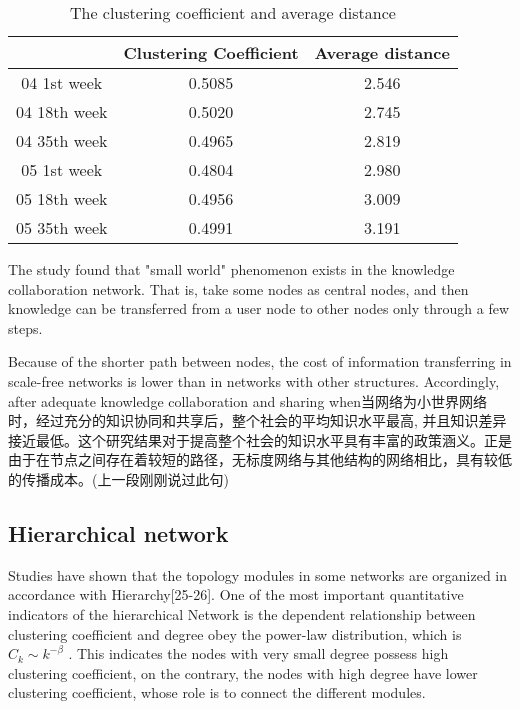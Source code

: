 \documentclass{elsarticle}
\begin{document}
\begin{table}[htpb]
  \centering
 \caption{The clustering coefficient and average distance} 
 \begin{tabular}{|c|c|c|}
   \hline
    &Clustering Coefficient&Average distance\\\hline
  04 1st week&0.5085&2.546\\\hline
  04 18th week&0.5020&2.745\\\hline
  04 35th week&0.4965&2.819\\\hline
  05 1st week&0.4804&2.980\\\hline
  05 18th week&0.4956&3.009\\\hline
  05 35th week&0.4991&3.191\\\hline
   \end{tabular}
 
\end{table}
The study found that "small world" phenomenon exists in the knowledge
collaboration network. That is, take some nodes as central nodes, and
then knowledge can be transferred from a user node to other nodes only
through a few steps.

Because of the shorter path between nodes, the cost of information transferring in scale-free networks is lower than in networks with other structures. Accordingly, after adequate knowledge collaboration and sharing when当网络为小世界网络时，经过充分的知识协同和共享后，整个社会的平均知识水平最高, 并且知识差异接近最低。这个研究结果对于提高整个社会的知识水平具有丰富的政策涵义。正是由于在节点之间存在着较短的路径，无标度网络与其他结构的网络相比，具有较低的传播成本。(上一段刚刚说过此句)

\subsection{Hierarchical network}
\label{sec:hierarchical-network}

Studies have shown that the topology modules in some networks are
organized in accordance with Hierarchy[25-26]. One of the most
important quantitative indicators of the hierarchical Network is the
dependent relationship between clustering coefficient and degree obey
the power-law distribution, which is $C_k\sim k^{-\beta}$  . This indicates the nodes with very small degree possess high clustering coefficient, on the contrary, the nodes with high degree have lower clustering coefficient, whose role is to connect the different modules.
\end{document}
